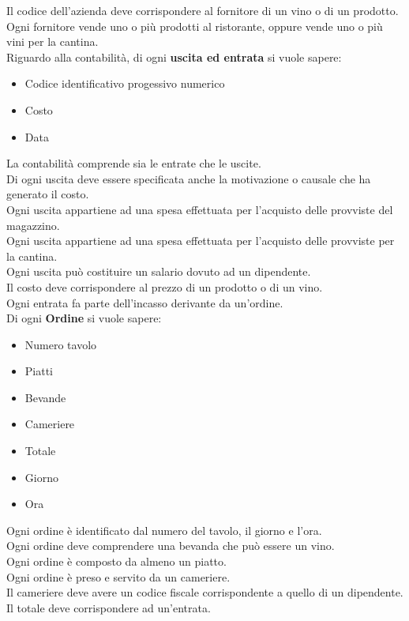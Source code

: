 Il codice dell'azienda deve corrispondere al fornitore di un vino o di un prodotto. \\
Ogni fornitore vende uno o più prodotti al ristorante, oppure vende uno o più vini per la cantina. \medskip \\
Riguardo alla contabilità, di ogni \textbf{uscita ed entrata} si vuole sapere:
\begin{itemize}
    \item Codice identificativo progessivo numerico
    \item Costo %
    \item Data
\end{itemize}
La contabilità comprende sia le entrate che le uscite. \\
Di ogni uscita deve essere specificata anche la motivazione o causale che ha generato il costo. \\
Ogni uscita appartiene ad una spesa effettuata per l'acquisto delle provviste del magazzino. \\
Ogni uscita appartiene ad una spesa effettuata per l'acquisto delle provviste per la cantina. \\
Ogni uscita può costituire un salario dovuto ad un dipendente. \\
Il costo deve corrispondere al prezzo di un prodotto o di un vino. \\
Ogni entrata fa parte dell'incasso derivante da un'ordine. \medskip \\
Di ogni \textbf{Ordine} si vuole sapere:
\begin{itemize}
    \item Numero tavolo 
    \item Piatti
    \item Bevande
    \item Cameriere
    \item Totale
    \item Giorno
    \item Ora
\end{itemize}
Ogni ordine è identificato dal numero del tavolo, il giorno e l'ora. \\
Ogni ordine deve comprendere una bevanda che può essere un vino. \\
Ogni ordine è composto da almeno un piatto.  \\
Ogni ordine è preso e servito da un cameriere. \\
Il cameriere deve avere un codice fiscale corrispondente a quello di un dipendente. \\
Il totale deve corrispondere ad un'entrata. \\
